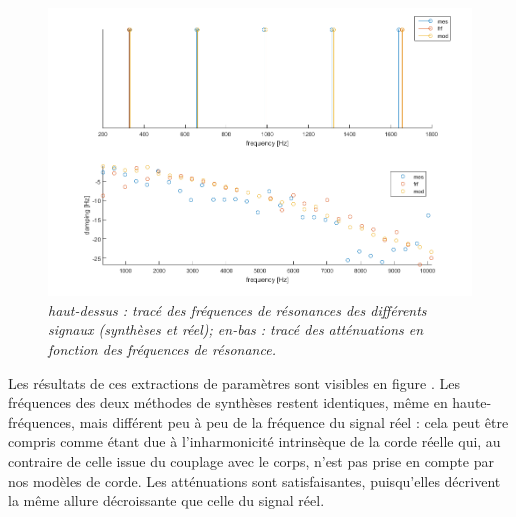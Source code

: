 \begin{figure}[h]
\includegraphics[scale=0.65]{figures/apotheose.png}
\caption{\textit{haut-dessus : tracé des fréquences de résonances des différents signaux (synthèses et réel); en-bas : tracé des atténuations en fonction des fréquences de résonance.}}
\label{apo}
\end{figure}

Les résultats de ces extractions de paramètres sont visibles en figure \label{apo}. Les fréquences des deux méthodes de synthèses restent identiques, même en haute-fréquences, mais différent peu à peu de la fréquence du signal réel : cela peut être compris comme étant due à l'inharmonicité intrinsèque de la corde réelle qui, au contraire de celle issue du couplage avec le corps, n'est pas prise en compte par nos modèles de corde. Les atténuations sont satisfaisantes, puisqu'elles décrivent la même allure décroissante que celle du signal réel.

